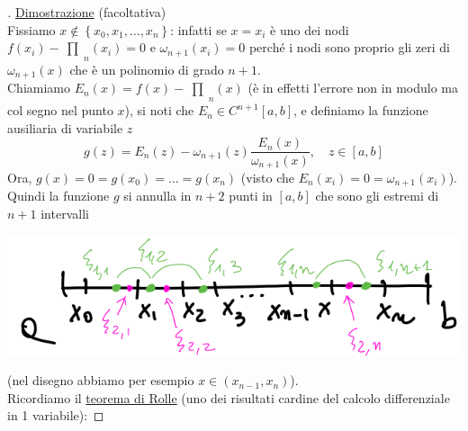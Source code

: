 \documentclass[12pt]{article}
\newcommand{\inter}{\begin{matrix}\prod\end{matrix}}
\begin{document}
\begin{proof}[\unskip\nopunct]
\uline{Dimostrazione} (facoltativa)\\
Fissiamo $x \notin \left\{ x_0, x_1, \dots, x_n \right\}$: infatti se $x=x_i$ è uno dei nodi $f(x_i) - \inter_n (x_i) = 0$ e $\omega_{n+1}(x_i)=0$ perché i nodi sono proprio gli zeri di $\omega_{n+1}(x)$ che è un polinomio di grado $n+1$.\\
Chiamiamo $E_n(x) = f(x) - \inter_n (x)$ (è in effetti l'errore non in modulo ma col segno nel punto $x$), si noti che $E_n \in C^{n+1}[a,b]$, e definiamo la funzione ausiliaria di variabile $z$
\[ g(z) = E_n(z) - \omega_{n+1}(z) \frac{E_n(x)}{\omega_{n+1}(x)}, \quad z \in [a,b] \]
Ora, $g(x) = 0 = g(x_0) = \dotso = g(x_n)$ (visto  che $E_n(x_i) = 0 = \omega_{n+1}(x_i)$). Quindi la funzione $g$ si annulla in $n+2$ punti in $[a,b]$ che sono gli estremi di $n+1$ intervalli
\begin{center}
    \includegraphics[scale=0.5]{img1_pag6.png}
\end{center}
(nel disegno abbiamo per esempio $x \in (x_{n-1}, x_n)$).\\
Ricordiamo il \uline{teorema di Rolle} (uno dei risultati cardine del calcolo differenziale in 1 variabile):


\end{proof}
\end{document}
